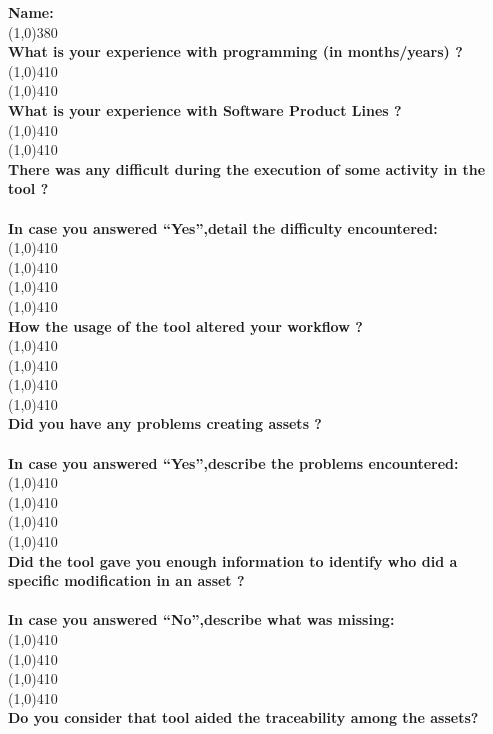 \textbf{Name: }
\\
\line(1,0){380}
\\
\textbf{What is your experience with programming (in months/years) ? }
\\
\line(1,0){410}
\\
\line(1,0){410}
\\
\textbf{What is your experience with Software Product Lines ? }
\\
\line(1,0){410}
\\
\line(1,0){410}
\\
\textbf{There was any difficult during the execution of some activity in the tool ?}
\\
\\
\textbf{In case you answered “Yes”,detail the difficulty encountered:}
\\
\line(1,0){410}
\\
\line(1,0){410}
\\
\line(1,0){410}
\\
\line(1,0){410}
\\
\textbf{How the usage of the tool altered your workflow ?  }
\\
\line(1,0){410}
\\
\line(1,0){410}
\\
\line(1,0){410}
\\
\line(1,0){410}
\\
\textbf{Did you have any problems creating assets ?}
\\
\\
\textbf{In case you answered “Yes”,describe the problems encountered:}
\\
\line(1,0){410}
\\
\line(1,0){410}
\\
\line(1,0){410}
\\
\line(1,0){410}
\\
\textbf{Did the tool gave you enough information to identify who did a specific modification in an asset ?}
\\
\\
\textbf{In case you answered “No”,describe what was missing:}
\\
\line(1,0){410}
\\
\line(1,0){410}
\\
\line(1,0){410}
\\
\line(1,0){410}
\\
\textbf{Do you consider that tool aided the traceability among the assets?}
\\
